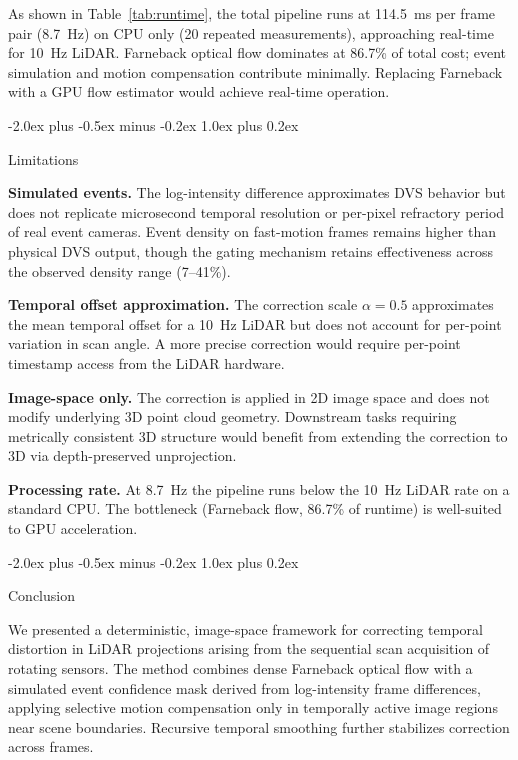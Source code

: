 \documentclass[conference]{IEEEtran}
\makeatletter
\def\section{\@startsection{section}{1}{\z@}
  {-2.0ex plus -0.5ex minus -0.2ex}
  {1.0ex plus 0.2ex}
  {\normalfont\large\bfseries\raggedright}}
\makeatother
\begin{document}
As shown in Table~\ref{tab:runtime}, the total pipeline runs at
114.5~ms per frame pair (8.7~Hz) on CPU only (20 repeated
measurements), approaching real-time for 10~Hz LiDAR. Farneback
optical flow dominates at 86.7\% of total cost; event simulation
and motion compensation contribute minimally. Replacing Farneback
with a GPU flow estimator would achieve real-time operation.

\section{Limitations}

\textbf{Simulated events.} The log-intensity difference
approximates DVS behavior but does not replicate microsecond
temporal resolution or per-pixel refractory period of real
event cameras. Event density on fast-motion frames remains
higher than physical DVS output, though the gating mechanism
retains effectiveness across the observed density range
(7--41\%).

\textbf{Temporal offset approximation.} The correction scale
$\alpha{=}0.5$ approximates the mean temporal offset for a
10~Hz LiDAR but does not account for per-point variation in
scan angle. A more precise correction would require per-point
timestamp access from the LiDAR hardware.

\textbf{Image-space only.} The correction is applied in 2D
image space and does not modify underlying 3D point cloud
geometry. Downstream tasks requiring metrically consistent 3D
structure would benefit from extending the correction to 3D
via depth-preserved unprojection.

\textbf{Processing rate.} At 8.7~Hz the pipeline runs below
the 10~Hz LiDAR rate on a standard CPU. The bottleneck
(Farneback flow, 86.7\% of runtime) is well-suited to GPU
acceleration.

\section{Conclusion}

We presented a deterministic, image-space framework for
correcting temporal distortion in LiDAR projections arising
from the sequential scan acquisition of rotating sensors.
The method combines dense Farneback optical flow with a
simulated event confidence mask derived from log-intensity
frame differences, applying selective motion compensation
only in temporally active image regions near scene boundaries.
Recursive temporal smoothing further stabilizes correction
across frames.
\end{document}
